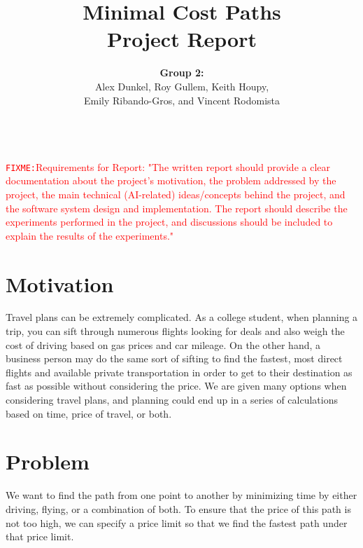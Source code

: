 \documentclass[11pt]{article}
\title{Minimal Cost Paths\\Project Report}
\author{ {\bf Group 2:} \\
Alex Dunkel,
Roy Gullem,
Keith Houpy, \\
Emily Ribando-Gros, and
Vincent Rodomista}
\newcommand{\FIXME}[1]{ \ \\ \hspace* {-1.5 cm}
  \textcolor{red}{\texttt{FIXME:}#1} \medskip\par}
\begin{document}
\maketitle

\FIXME{Requirements for Report:
"The written report should provide a clear documentation about the project's motivation, the problem addressed by the project, the main technical (AI-related) ideas/concepts behind the project, and the software system design and implementation. 
The report should describe the experiments performed in the project, and discussions should be included to explain the results of the experiments."}

\section{Motivation}

Travel plans can be extremely complicated. As a college student, when planning a trip, you can sift through numerous flights looking for deals and also weigh the cost of driving based on gas prices and car mileage. On the other hand, a business person may do the same sort of sifting to find the fastest, most direct flights and available private transportation in order to get to their destination as fast as possible without considering the price. We are given many options when considering travel plans, and planning could end up in a series of calculations based on time, price of travel, or both. 

\section{Problem}
We want to find the path from one point to another by minimizing time by either driving, flying, or a combination of both. To ensure that the price of this path is not too high, we can specify a price limit so that we find the fastest path under that price limit.
\end{document}
